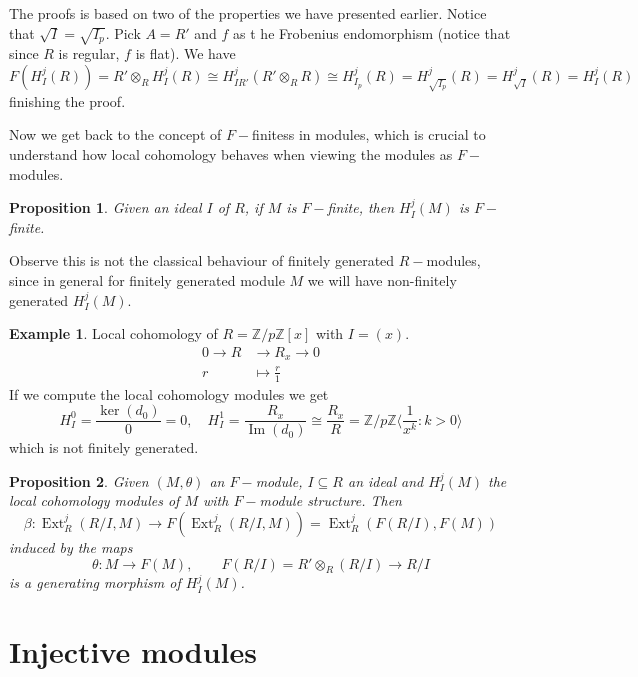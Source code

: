 \documentclass[leqno]{article}
\newtheorem{proposition}{Proposition}[section]
\theoremstyle{definition}
\newtheorem{example}{Example}[section]
\DeclareMathOperator{\Ext}{Ext}
\DeclareMathOperator{\im}{Im}
\begin{document}
The proofs is based on two of the properties we have presented earlier. Notice that $\sqrt{I}=\sqrt{I_p}$. Pick $A = R'$ and $f$ as t he Frobenius endomorphism (notice that since $R$ is regular, $f$ is flat). We have
\[
F(H_I^j(R)) = R'\otimes _RH_I^j(R) \cong H_{IR'}^j(R'\otimes _R R) \cong H_{I_p}^j(R) = H_{\sqrt{I_p}}^j(R) = H_{\sqrt{I}}^j(R)= H_{I}^j(R)
\] 
finishing the proof.

Now we get back to the concept of $F-$finitess in modules, which is crucial to understand how local cohomology behaves when viewing the modules as $F-$modules.

 \begin{proposition} Given an ideal $I$ of $R$, if $M$ is $F-$finite, then  $H^j_I(M)$ is  $F-$finite.
\end{proposition}

Observe this is not the classical behaviour of finitely generated $R-$modules, since in general  for finitely generated module $M$ we will have non-finitely generated $H^j_I(M)$.

\begin{example} Local cohomology of $R = \mathbb{Z} / p\mathbb{Z}[x]$ with $I = (x)$.
  \begin{align*}
	0 \to R & \to R_x \to 0 \\
	r &\mapsto \frac{r}{1}
  \end{align*}
  If we compute the local cohomology modules we get 
  \[
  H^0_{I} = \frac{\ker(d_0)}{0} = 0, \quad H^1_{I} = \frac{R_x}{\im(d_0)} \cong  \frac{R_x}{R}=  \mathbb{Z} / p\mathbb{Z}\langle \frac{1}{x^k}: k>0 \rangle 
\]
  which is not finitely generated.
\end{example}

\begin{proposition} Given $(M, \theta )$ an $F-$module, $I\subseteq R$ an ideal and $H^j_I(M)$ the local cohomology modules of $M$ with  $F-$module structure. Then
   \[
  \beta :\Ext_{R}^j (R / I, M) \to F(\Ext_R^j(R / I, M)) = \Ext_R^j(F(R / I), F(M))
  \] 
  induced by the maps
  \[
  \theta : M \to F(M) , \qquad F(R / I) = R'\otimes _R (R / I) \to R / I
  \] 
  is a generating morphism of $H_I^j(M)$.
\end{proposition}














\section{Injective modules}
\end{document}
